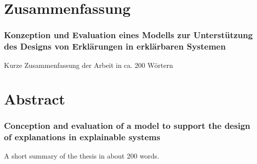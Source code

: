 \chapter*{Zusammenfassung}

\subsection*{Konzeption und Evaluation eines Modells zur Unterstützung des Designs von Erklärungen in erklärbaren Systemen}

Kurze Zusammenfassung der Arbeit in ca. 200 Wörtern

\clearpage

\chapter*{Abstract}

\subsection*{Conception and evaluation of a model to support the design of explanations in explainable systems}

A short summary of the thesis in about 200 words.

\clearpage
